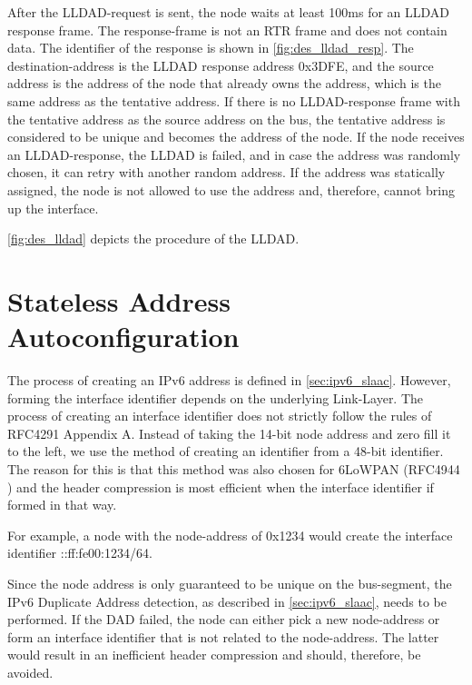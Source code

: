 After the LLDAD-request is sent, the node waits at least 100ms for an LLDAD response frame.
The response-frame is not an RTR frame and does not contain data.
The identifier of the response is shown in \autoref{fig:des_lldad_resp}.
The destination-address is the LLDAD response address 0x3DFE, and the source address is the address of the node that already owns the address,
which is the same address as the tentative address.
If there is no LLDAD-response frame with the tentative address as the source address on the bus,
the tentative address is considered to be unique and becomes the address of the node.
If the node receives an LLDAD-response, the LLDAD is failed, and in case the address was randomly chosen, it can retry with another random address.
If the address was statically assigned, the node is not allowed to use the address and, therefore, cannot bring up the interface.



\autoref{fig:des_lldad} depicts the procedure of the LLDAD.

\section{Stateless Address Autoconfiguration}
\label{sec:impl_slaac}

The process of creating an IPv6 address is defined in \autoref{sec:ipv6_slaac}.
However, forming the interface identifier depends on the underlying Link-Layer.
The process of creating an interface identifier does not strictly follow the rules of RFC4291 \cite{rfc4291} Appendix A.
Instead of taking the 14-bit node address and zero fill it to the left, we use the method of creating an identifier from a 48-bit identifier.
The reason for this is that this method was also chosen for 6LoWPAN (RFC4944 \cite{rfc4944}) and the header compression
is most efficient when the interface identifier if formed in that way.

For example, a node with the node-address of 0x1234 would create the interface identifier ::ff:fe00:1234/64.

Since the node address is only guaranteed to be unique on the bus-segment, the IPv6 Duplicate Address detection,
as described in \autoref{sec:ipv6_slaac}, needs to be performed.
If the DAD failed, the node can either pick a new node-address or form an interface identifier that is not related to the node-address.
The latter would result in an inefficient header compression and should, therefore, be avoided.

